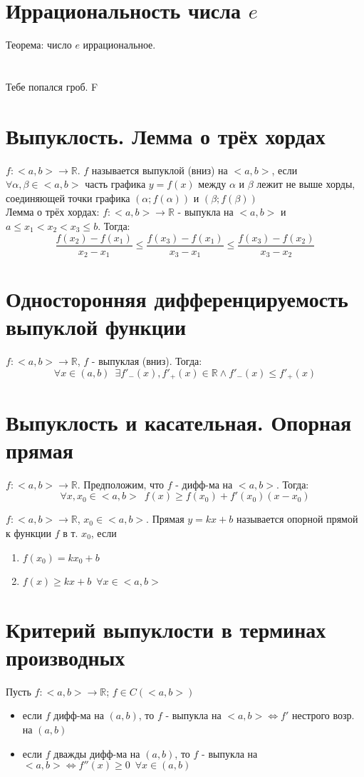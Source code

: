 \documentclass[11pt, a4paper]{article}
\def\R{\mathbb{R}}
\def\sp{\, \, \,}
\begin{document}
    \section{Иррациональность числа $e$}
    Теорема: число $e$ иррациональное.

    \section{}
    Тебе попался гроб. F

    \section{Выпуклость. Лемма о трёх хордах}
    $f: <a,b> \to \R$. $f$ называется выпуклой (вниз) на $<a, b>$, если $\forall \alpha , \beta \in <a, b>$ часть графика $y = f(x)$ между $\alpha$ и $\beta$ лежит не выше хорды, соединяющей точки графика $(\alpha ; f(\alpha))$ и $(\beta ; f(\beta))$\\

    Лемма о трёх хордах: $f: <a, b> \to \R$ - выпукла на $<a, b>$ и $a \leq x_1 < x_2 < x_3 \leq b$. Тогда:
    $$\frac{f(x_2) - f(x_1)}{x_2 - x_1} \leq \frac{f(x_3) - f(x_1)}{x_3 - x_1} \leq \frac{f(x_3) - f(x_2)}{x_3 - x_2}$$
    
    \section{Односторонняя дифференцируемость выпуклой функции}
    $f: <a, b> \to \R$, $f$ - выпуклая (вниз). Тогда:
    $$\forall x \in (a,b) \sp \exists f'_-(x), f'_+(x) \in \R \land f'_-(x) \leq f'_+(x)$$

    \section{Выпуклость и касательная. Опорная прямая}
    $f: <a, b> \to \R$. Предположим, что $f$ - дифф-ма на $<a, b>$. Тогда:
    $$\forall x, x_0 \in <a, b> \sp f(x) \geq f(x_0) + f'(x_0)(x-x_0)$$

    $f: <a, b> \to \R$, $x_0 \in <a, b>$. Прямая $y=kx+b$ называется опорной прямой к функции $f$ в т. $x_0$, если
    \begin{enumerate}
        \item $f(x_0) = kx_0 + b$
        \item $f(x) \geq kx + b \sp \forall x \in <a,b>$
    \end{enumerate}

    \section{Критерий выпуклости в терминах производных}
    Пусть $f: <a,b> \to \R$; $f \in C(<a,b>)$
    \begin{itemize}
        \item если $f$ дифф-ма на $(a,b)$, то $f$ - выпукла на $<a, b> \iff f'$ нестрого возр. на $(a, b)$
        \item если $f$ дважды дифф-ма на $(a, b)$, то $f$ - выпукла на $<a, b> \iff f''(x) \geq 0 \sp \forall x \in (a,b)$
    \end{itemize}
\end{document}
